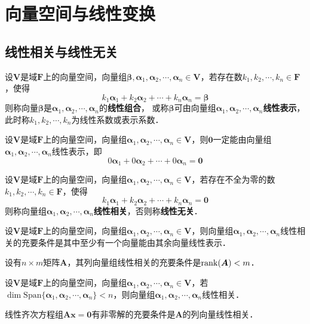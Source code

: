 \documentclass[12pt, a4paper, oneside, UTF8]{ctexbook}
\begin{document}
% 
\else
\fi
\chapter{向量空间与线性变换}
\section{线性相关与线性无关}
\begin{definition}
    设$\bm{V}$是域$\bm{F}$上的向量空间，向量组$\bm{\beta},\bm{\alpha}_1, \bm{\alpha}_2, \cdots, \bm{\alpha}_n \in \bm{V}$，若\textcolor{Burgundy}{存在}数$k_1, k_2, \cdots, k_n \in \bm{F}$，使得
    \[
        k_1\bm{\alpha}_1 + k_2\bm{\alpha}_2 + \cdots + k_n\bm{\alpha}_n = \bm{\beta}
    \]
    则称向量$\bm{\beta}$是$\bm{\alpha}_1, \bm{\alpha}_2, \cdots, \bm{\alpha}_n$的\textbf{线性组合}，
    或称$\bm{\beta}$可由向量组$\bm{\alpha}_1, \bm{\alpha}_2, \cdots, \bm{\alpha}_n$\textbf{线性表示}，
    此时称$k_1, k_2, \cdots, k_n$为线性系数或表示系数．
\end{definition}
\begin{corollary}
    设$\bm{V}$是域$\bm{F}$上的向量空间，向量组$\bm{\alpha}_1, \bm{\alpha}_2, \cdots, \bm{\alpha}_n \in \bm{V}$，则$\bm{0}$一定能由向量组$\bm{\alpha}_1, \bm{\alpha}_2, \cdots, \bm{\alpha}_n$线性表示，即
    \[
        0\bm{\alpha}_1 + 0\bm{\alpha}_2 + \cdots + 0\bm{\alpha}_n = \bm{0}
    \]
\end{corollary}
\begin{definition}
    设$\bm{V}$是域$\bm{F}$上的向量空间，向量组$\bm{\alpha}_1, \bm{\alpha}_2, \cdots, \bm{\alpha}_n \in \bm{V}$，若存在\textcolor{Burgundy}{不全为零}的数$k_1, k_2, \cdots, k_n \in \bm{F}$，使得
    \[
        k_1\bm{\alpha}_1 + k_2\bm{\alpha}_2 + \cdots + k_n\bm{\alpha}_n = \bm{0}
    \]
    则称向量组$\bm{\alpha}_1, \bm{\alpha}_2, \cdots, \bm{\alpha}_n$\textbf{线性相关}，否则称\textbf{线性无关}．
\end{definition}
\begin{theorem}
    设$\bm{V}$是域$\bm{F}$上的向量空间，向量组$\bm{\alpha}_1, \bm{\alpha}_2, \cdots, \bm{\alpha}_n \in \bm{V}$，则向量组$\bm{\alpha}_1, \bm{\alpha}_2, \cdots, \bm{\alpha}_n$线性相关的充要条件是其中至少有一个向量能由其余向量线性表示．
\end{theorem}
\begin{theorem}
    设有$n\times m$矩阵$\bm{A}$，其列向量组线性相关的充要条件是$\mathrm{rank}(\bm{A}) < m$．
\end{theorem}
\begin{theorem}
    设$\bm{V}$是域$\bm{F}$上的向量空间，向量组$\bm{\alpha}_1, \bm{\alpha}_2, \cdots, \bm{\alpha}_n \in \bm{V}$，若$\operatorname{dim}\mathrm{Span}\{\bm{\alpha}_1, \bm{\alpha}_2, \cdots, \bm{\alpha}_n\}<n$，则向量组$\bm{\alpha}_1, \bm{\alpha}_2, \cdots, \bm{\alpha}_n$线性相关．
\end{theorem}
\begin{theorem}
    线性齐次方程组$\bm{A}\bm{x}=\bm{0}$有非零解的充要条件是$\bm{A}$的列向量线性相关．
\end{theorem}
\end{document}
